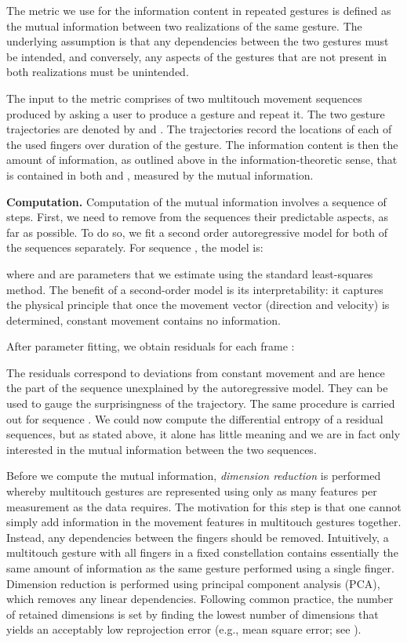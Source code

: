 \documentclass{sig-alternate-10pt}
\begin{document}
The metric we use for the information content in repeated gestures
is defined as the mutual information between two realizations of the
same gesture. The underlying assumption is that any dependencies
between the two gestures must be intended, and conversely, any aspects of the gestures that are not present in both realizations must be unintended. 




The input to the metric comprises of two multitouch movement sequences produced by asking a user to produce a gesture and repeat it.
The two gesture trajectories are denoted by  and .
The trajectories record the locations of each of the used fingers
over duration of the gesture. 
The information content is then the amount of information, as
outlined above in the information-theoretic sense, that is contained in both  and , measured by the mutual information.

\textbf{Computation.} Computation of the mutual information involves a sequence of steps.
First, we need to remove from the sequences their predictable
aspects, as far as possible. To do so, we fit a second order autoregressive model for both of the sequences separately. 
For sequence , the model is: 

where  and  are parameters that we estimate
using the standard least-squares method.
The benefit of a second-order model is its interpretability: it captures the physical principle that once the movement vector (direction and velocity) is determined, constant movement contains no information. 

After parameter fitting, we obtain residuals  for each frame :

The residuals  correspond to deviations from constant movement and are hence the part of the sequence unexplained by the autoregressive model. They can be used to gauge the surprisingness of the trajectory. The same procedure is carried out for sequence .
We could now compute the differential entropy of a residual sequences, but as stated above, it alone has little meaning and we are in fact only interested in the mutual information between the two sequences.

Before we compute the mutual information, \emph{dimension reduction} is performed whereby multitouch gestures are represented using only as many features per measurement as the data requires.
The motivation for this step is that one cannot simply add information in the movement features in multitouch gestures together. Instead, any dependencies between the fingers should be removed.
Intuitively, a multitouch gesture with all fingers in a fixed constellation contains essentially the same amount of information as the same gesture performed using a single finger.
Dimension reduction is performed using principal component analysis (PCA), which removes any linear dependencies. Following common practice, the number of retained dimensions is set by finding the lowest number of dimensions that yields an acceptably low reprojection error (e.g., mean square error; see \cite{oulasvirta2013information}). 
\end{document}
